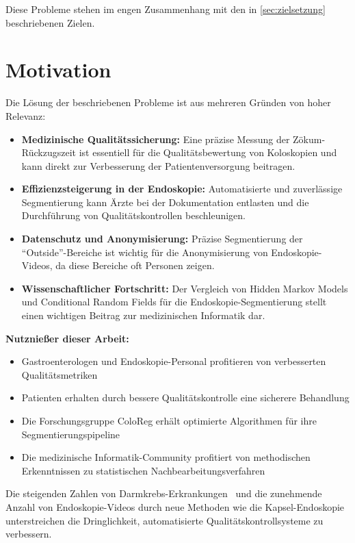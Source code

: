 Diese Probleme stehen im engen Zusammenhang mit den in \cref{sec:zielsetzung} beschriebenen Zielen.

\section{Motivation}

Die Lösung der beschriebenen Probleme ist aus mehreren Gründen von hoher Relevanz:

\begin{itemize}
\item \textbf{Medizinische Qualitätssicherung:} Eine präzise Messung der Zökum-Rückzugszeit ist essentiell für die Qualitätsbewertung von Koloskopien und kann direkt zur Verbesserung der Patientenversorgung beitragen.

\item \textbf{Effizienzsteigerung in der Endoskopie:} Automatisierte und zuverlässige Segmentierung kann Ärzte bei der Dokumentation entlasten und die Durchführung von Qualitätskontrollen beschleunigen.

\item \textbf{Datenschutz und Anonymisierung:} Präzise Segmentierung der \enquote{Outside}-Bereiche ist wichtig für die Anonymisierung von Endoskopie-Videos, da diese Bereiche oft Personen zeigen.

\item \textbf{Wissenschaftlicher Fortschritt:} Der Vergleich von Hidden Markov Models und Conditional Random Fields für die Endoskopie-Segmentierung stellt einen wichtigen Beitrag zur medizinischen Informatik dar.
\end{itemize}

\textbf{Nutznießer dieser Arbeit:}
\begin{itemize}
\item Gastroenterologen und Endoskopie-Personal profitieren von verbesserten Qualitätsmetriken
\item Patienten erhalten durch bessere Qualitätskontrolle eine sicherere Behandlung  
\item Die Forschungsgruppe ColoReg erhält optimierte Algorithmen für ihre Segmentierungspipeline
\item Die medizinische Informatik-Community profitiert von methodischen Erkenntnissen zu statistischen Nachbearbeitungsverfahren
\end{itemize}

Die steigenden Zahlen von Darmkrebs-Erkrankungen~\citep{acs-2024,ferlay-2024} und die zunehmende Anzahl von Endoskopie-Videos durch neue Methoden wie die Kapsel-Endoskopie~\citep{koulaouzidis-2021} unterstreichen die Dringlichkeit, automatisierte Qualitätskontrollsysteme zu verbessern.

